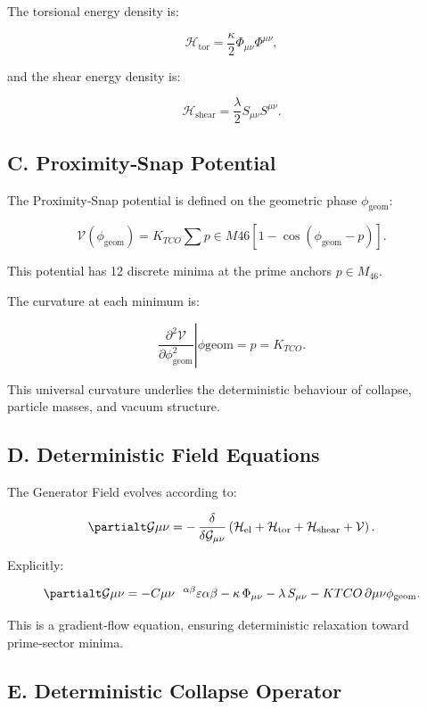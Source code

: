 \documentclass[reprint,amsmath,amssymb,aps,prl,floatfix]{revtex4-2}
\begin{document}
\begin{itemize}
The torsional energy density is:

\[
\mathcal{H}_{\mathrm{tor}}
=
\frac{\kappa}{2}
\Phi_{\mu\nu}\Phi^{\mu\nu},
\]

and the shear energy density is:

\[
\mathcal{H}_{\mathrm{shear}}
=
\frac{\lambda}{2}
S_{\mu\nu}S^{\mu\nu}.
\]

\subsection{C. Proximity‑Snap Potential}

The Proximity‑Snap potential is defined on the geometric phase \(\phi_{\mathrm{geom}}\):

\[
\mathcal{V}(\phi_{\mathrm{geom}})
=
K_{TCO}
\sum{p \in M{46}}
\left[
1 - \cos(\phi_{\mathrm{geom}} - p)
\right].
\]

This potential has 12 discrete minima at the prime anchors \(p \in M_{46}\).

The curvature at each minimum is:

\[
\left.
\frac{\partial^2 \mathcal{V}}{\partial \phi_{\mathrm{geom}}^2}
\right|{\phi{\mathrm{geom}} = p}
=
K_{TCO}.
\]

This universal curvature underlies the deterministic behaviour of collapse, particle masses, and vacuum structure.

\subsection{D. Deterministic Field Equations}

The Generator Field evolves according to:

\[
\partialt \mathcal{G}{\mu\nu}
=
-\,\frac{\delta}{\delta \mathcal{G}_{\mu\nu}}
\left(
\mathcal{H}_{\mathrm{el}}
+
\mathcal{H}_{\mathrm{tor}}
+
\mathcal{H}_{\mathrm{shear}}
+
\mathcal{V}
\right).
\]

Explicitly:

\[
\partialt \mathcal{G}{\mu\nu}
=
- C{\mu\nu}^{\ \ \alpha\beta}\varepsilon{\alpha\beta}
- \kappa\,\Phi_{\mu\nu}
- \lambda\,S_{\mu\nu}
- K{TCO}\,\partial{\mu\nu}\phi_{\mathrm{geom}}.
\]

This is a gradient‑flow equation, ensuring deterministic relaxation toward prime‑sector minima.

\subsection{E. Deterministic Collapse Operator}


\end{itemize}
\end{document}
